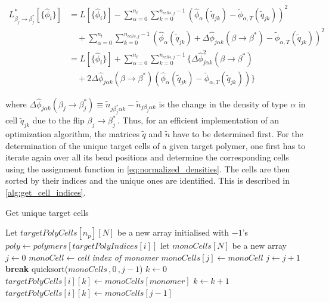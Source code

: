 \documentclass[bachelor,       %
               oneside,        %
               BCOR10mm,       %
               ngerman, english %
               ]{GAUBM}
\begin{document}
\begin{align}
    L^*_{\beta_j\rightarrow\beta_j^*}[\{\hat\phi_i\}] &= L[\{\hat\phi_i\}] 
    - \sum_{\alpha=0}^{n_t}\sum_{k=0}^{n_{cells,j}-1}  \left(\hat\phi_\alpha(\tilde q_{jk})-\tilde\phi_{\alpha,T}(\tilde q_{jk})\right)^2\nonumber \\
    & \quad + \sum_{\alpha=0}^{n_t}\sum_{k=0}^{n_{cells,j}-1}  \left(\hat\phi_\alpha(\tilde q_{jk})+\Delta\hat\phi_{ j\alpha k}(\beta\rightarrow\beta^*)-\tilde\phi_{\alpha,T}(\tilde q_{jk})\right)^2\nonumber \\
    &= L[\{\hat\phi_i\}] 
    + \sum_{\alpha=0}^{n_t}\sum_{k=0}^{n_{cells,j}-1}  \biggl\{\Delta\hat\phi^2_{ j\alpha k}(\beta\rightarrow\beta^*) \nonumber\\
    &\quad + 2\Delta\hat\phi_{ j\alpha k}(\beta\rightarrow\beta^*)\left(\hat\phi_{\alpha}(\tilde q_{jk})-\tilde\phi_{\alpha,T}(\tilde q_{jk})\right)\biggr\}
\end{align}

where $\Delta\hat\phi_{ j\alpha k}(\beta_j\rightarrow\beta_j^*)\equiv\tilde n_{j\beta_j^*\alpha k}-\tilde n_{j\beta_j\alpha k}$ is the change in the density of type $\alpha$ in cell $\tilde q_{jk}$ due to the flip $\beta_j\rightarrow\beta_j^*\,$. Thus, for an efficient implementation of an optimization algorithm, the matrices $\tilde q$ and $\tilde n$ have to be determined first. For the determination of the unique target cells of a given target polymer, one first has to iterate again over all its bead positions and determine the corresponding cells using the assignment function in \autoref{eq:normalized_densities}. The cells are then sorted by their indices and the unique ones are identified. This is described in \autoref{alg:get_cell_indices}. 


\begin{algorithm}[H]
\caption{Get unique target cells}\label{alg:get_cell_indices}
\begin{algorithmic}[1]
\State Let $targetPolyCells[n_p][N]$ be a new array initialised with $-1$'s
    \State $poly \gets polymers[targetPolyIndices[i]]$
    \State let $monoCells[N]$ be a new array
    \State $j\gets 0$
        \State $monoCell\gets$\textit{cell index of monomer}
            \State $monoCells[j]\gets monoCell$
            \State $j\gets j+1$
            \State \textbf{break}
        \EndIf
    \EndFor
    \State quicksort($monoCells\,,0\,,j-1$)
    \State $k\gets 0$
            \State $targetPolyCells[i][k]\gets monoCells[monomer]$
            \State $k\gets k+1$
        \EndIf
    \EndFor
    \State $targetPolyCells[i][k]\gets monoCells[j-1]$
\EndFor
\end{algorithmic}
\end{algorithm}
\end{document}
